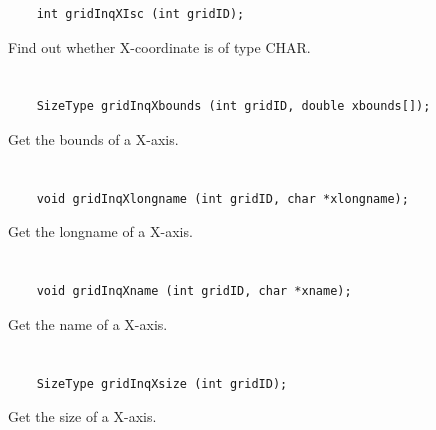 \begin{verbatim}
    int gridInqXIsc (int gridID);
\end{verbatim}

Find out whether X-coordinate is of type CHAR.


\section*{\tt {}}

\begin{verbatim}
    SizeType gridInqXbounds (int gridID, double xbounds[]);
\end{verbatim}

Get the bounds of a X-axis.


\section*{\tt {}}

\begin{verbatim}
    void gridInqXlongname (int gridID, char *xlongname);
\end{verbatim}

Get the longname of a X-axis.


\section*{\tt {}}

\begin{verbatim}
    void gridInqXname (int gridID, char *xname);
\end{verbatim}

Get the name of a X-axis.


\section*{\tt {}}

\begin{verbatim}
    SizeType gridInqXsize (int gridID);
\end{verbatim}

Get the size of a X-axis.


\section*{\tt {}}

